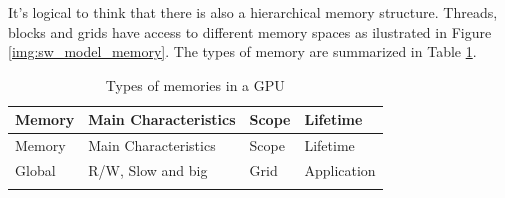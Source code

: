 \documentclass[
  12pt,
  a4paperpaper,
]{report}
\begin{document}
It's logical to think that there is also a hierarchical memory
structure. Threads, blocks and grids have access to different memory
spaces as ilustrated in Figure \ref{img:sw_model_memory}. The types of
memory are summarized in Table \ref{tab:memory_hierarchy}.

\newpage

\begin{longtable}[]{@{}llll@{}}
\caption{Types of memories in a GPU
\label{tab:memory_hierarchy}}\tabularnewline
\toprule
\begin{minipage}[b]{0.13\columnwidth}\raggedright
Memory\strut
\end{minipage} & \begin{minipage}[b]{0.53\columnwidth}\raggedright
Main Characteristics\strut
\end{minipage} & \begin{minipage}[b]{0.09\columnwidth}\raggedright
Scope\strut
\end{minipage} & \begin{minipage}[b]{0.13\columnwidth}\raggedright
Lifetime\strut
\end{minipage}\tabularnewline
\midrule
\endfirsthead
\toprule
\begin{minipage}[b]{0.13\columnwidth}\raggedright
Memory\strut
\end{minipage} & \begin{minipage}[b]{0.53\columnwidth}\raggedright
Main Characteristics\strut
\end{minipage} & \begin{minipage}[b]{0.09\columnwidth}\raggedright
Scope\strut
\end{minipage} & \begin{minipage}[b]{0.13\columnwidth}\raggedright
Lifetime\strut
\end{minipage}\tabularnewline
\midrule
\endhead
\begin{minipage}[t]{0.13\columnwidth}\raggedright
Global\strut
\end{minipage} & \begin{minipage}[t]{0.53\columnwidth}\raggedright
R/W, Slow and big\strut
\end{minipage} & \begin{minipage}[t]{0.09\columnwidth}\raggedright
Grid\strut
\end{minipage} & \begin{minipage}[t]{0.13\columnwidth}\raggedright
Application\strut
\end{minipage}\tabularnewline
\begin{minipage}[t]{0.13\columnwidth}\raggedright

\end{minipage}
\end{longtable}
\end{document}
